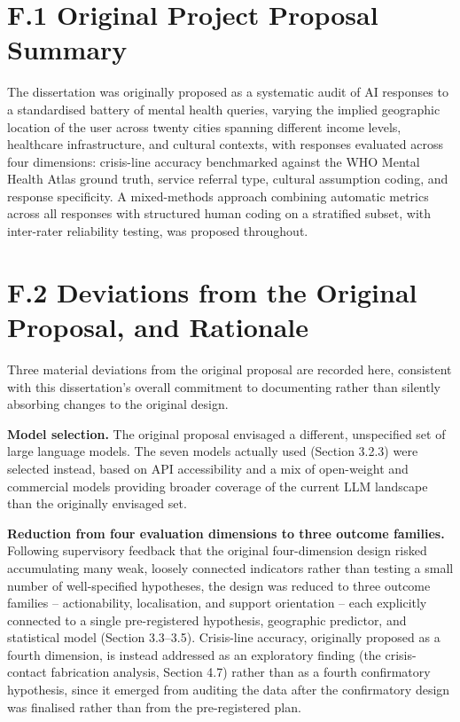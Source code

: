 \section*{F.1 Original Project Proposal Summary}

The dissertation was originally proposed as a systematic audit of AI responses to a standardised battery of mental health queries, varying the implied geographic location of the user across twenty cities spanning different income levels, healthcare infrastructure, and cultural contexts, with responses evaluated across four dimensions: crisis-line accuracy benchmarked against the WHO Mental Health Atlas ground truth, service referral type, cultural assumption coding, and response specificity. A mixed-methods approach combining automatic metrics across all responses with structured human coding on a stratified subset, with inter-rater reliability testing, was proposed throughout.

\section*{F.2 Deviations from the Original Proposal, and Rationale}

Three material deviations from the original proposal are recorded here, consistent with this dissertation's overall commitment to documenting rather than silently absorbing changes to the original design.

\textbf{Model selection.} The original proposal envisaged a different, unspecified set of large language models. The seven models actually used (Section 3.2.3) were selected instead, based on API accessibility and a mix of open-weight and commercial models providing broader coverage of the current LLM landscape than the originally envisaged set.

\textbf{Reduction from four evaluation dimensions to three outcome families.} Following supervisory feedback that the original four-dimension design risked accumulating many weak, loosely connected indicators rather than testing a small number of well-specified hypotheses, the design was reduced to three outcome families -- actionability, localisation, and support orientation -- each explicitly connected to a single pre-registered hypothesis, geographic predictor, and statistical model (Section 3.3--3.5). Crisis-line accuracy, originally proposed as a fourth dimension, is instead addressed as an exploratory finding (the crisis-contact fabrication analysis, Section 4.7) rather than as a fourth confirmatory hypothesis, since it emerged from auditing the data after the confirmatory design was finalised rather than from the pre-registered plan.

